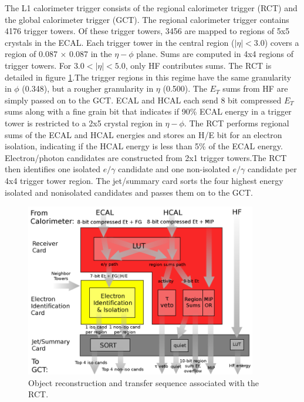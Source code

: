 \documentclass[oneside, letterpaper, oldfontcommands]{memoir}
\begin{document}
\qquad The L1 calorimeter trigger consists of the regional calorimeter trigger (RCT) and the global calorimeter trigger (GCT). The regional calorimeter trigger contains 4176 trigger towers. Of these trigger towers, 3456 are mapped to regions of 5x5 crystals in the ECAL. Each trigger tower in the central region ($|\eta| < 3.0$) covers a region of 0.087 $\times$ 0.087 in the $\eta - \phi$ plane. Sums are computed in 4x4 regions of trigger towers. For $3.0 < |\eta| < 5.0$, only HF contributes sums. The RCT is detailed in figure \ref{fig:rct}.The trigger regions in this regime have the same granularity in $\phi$ (0.348), but a rougher granularity in $\eta$ (0.500). The $E_{T}$ sums from HF are simply passed on to the GCT. ECAL and HCAL each send 8 bit compressed $E_{T}$ sums along with a fine grain bit that indicates if 90\% ECAL energy in a trigger tower is restricted to a 2x5 crystal region in $\eta - \phi$. The RCT performs regional sums of the ECAL and HCAL energies and stores an H/E bit for an electron isolation, indicating if the HCAL energy is less than 5\% of the ECAL energy. Electron/photon candidates are constructed from 2x1 trigger towers.The RCT then identifies one isolated $e/\gamma$ candidate and one non-isolated $e/\gamma$ candidate per 4x4 trigger tower region. The jet/summary card sorts the four highest energy isolated and nonisolated candidates and passes them on to the GCT. 

\begin{figure}[here]
\includegraphics[width=0.9\textwidth]{rct.png}
\caption{Object reconstruction and transfer sequence associated with the RCT.}
\label{fig:rct}
\end{figure}
\end{document}
